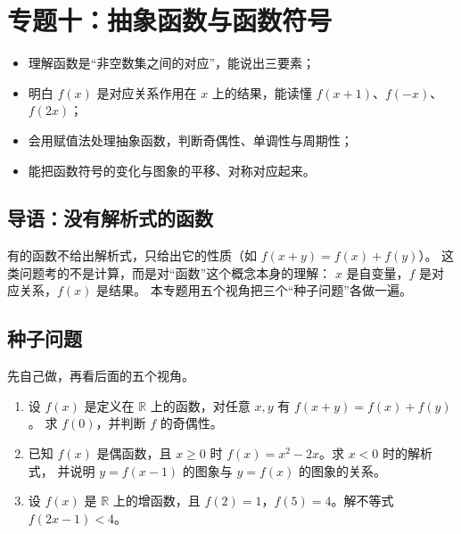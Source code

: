 \section{专题十：抽象函数与函数符号}

\begin{learnobjective}
\begin{itemize}
  \item 理解函数是“非空数集之间的对应”，能说出三要素；
  \item 明白 $f(x)$ 是对应关系作用在 $x$ 上的结果，能读懂 $f(x+1)$、$f(-x)$、$f(2x)$；
  \item 会用赋值法处理抽象函数，判断奇偶性、单调性与周期性；
  \item 能把函数符号的变化与图象的平移、对称对应起来。
\end{itemize}
\end{learnobjective}

\begin{preview}
\subsection{导语：没有解析式的函数}
有的函数不给出解析式，只给出它的性质（如 $f(x+y)=f(x)+f(y)$）。
这类问题考的不是计算，而是对“函数”这个概念本身的理解：
$x$ 是自变量，$f$ 是对应关系，$f(x)$ 是结果。
本专题用五个视角把三个“种子问题”各做一遍。

\subsection{种子问题}
先自己做，再看后面的五个视角。
\begin{enumerate}
  \item 设 $f(x)$ 是定义在 $\mathbb{R}$ 上的函数，对任意 $x,y$ 有 $f(x+y)=f(x)+f(y)$。
        求 $f(0)$，并判断 $f$ 的奇偶性。
  \item 已知 $f(x)$ 是偶函数，且 $x\geq0$ 时 $f(x)=x^2-2x$。求 $x<0$ 时的解析式，
        并说明 $y=f(x-1)$ 的图象与 $y=f(x)$ 的图象的关系。
  \item 设 $f(x)$ 是 $\mathbb{R}$ 上的增函数，且 $f(2)=1$，$f(5)=4$。解不等式 $f(2x-1)<4$。
\end{enumerate}
\end{preview}

